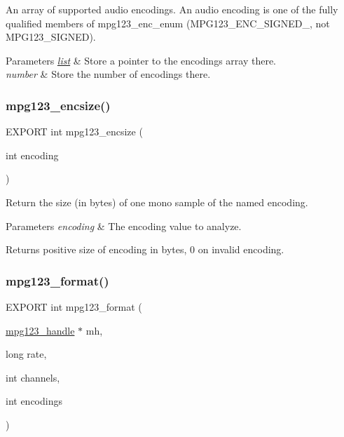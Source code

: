 An array of supported audio encodings. An audio encoding is one of the fully qualified members of mpg123\+\_\+enc\+\_\+enum (M\+P\+G123\+\_\+\+E\+N\+C\+\_\+\+S\+I\+G\+N\+E\+D\+\_, not M\+P\+G123\+\_\+\+S\+I\+G\+N\+ED). 
\begin{DoxyParams}{Parameters}
{\em \hyperlink{protocollist-p}{list}} & Store a pointer to the encodings array there. \\
\hline
{\em number} & Store the number of encodings there. \\
\hline
\end{DoxyParams}
\mbox{\label{group__mpg123__output_gaa34fdc84d464e66f02cc226bef25767b}} 
\subsubsection{\texorpdfstring{mpg123\+\_\+encsize()}{mpg123\_encsize()}}
{\footnotesize\ttfamily E\+X\+P\+O\+RT int mpg123\+\_\+encsize (\begin{DoxyParamCaption}\item[{int}]{encoding }\end{DoxyParamCaption})}

Return the size (in bytes) of one mono sample of the named encoding. 
\begin{DoxyParams}{Parameters}
{\em encoding} & The encoding value to analyze. \\
\hline
\end{DoxyParams}
\begin{DoxyReturn}{Returns}
positive size of encoding in bytes, 0 on invalid encoding. 
\end{DoxyReturn}
\mbox{\label{group__mpg123__output_ga9e614a7d7c1de12e981d8f7add9a2d4b}} 
\subsubsection{\texorpdfstring{mpg123\+\_\+format()}{mpg123\_format()}}
{\footnotesize\ttfamily E\+X\+P\+O\+RT int mpg123\+\_\+format (\begin{DoxyParamCaption}\item[{\hyperlink{group__mpg123__init_ga6728e2839a395f3a07d4514da659faca}{mpg123\+\_\+handle} $\ast$}]{mh,  }\item[{long}]{rate,  }\item[{int}]{channels,  }\item[{int}]{encodings }\end{DoxyParamCaption})}

